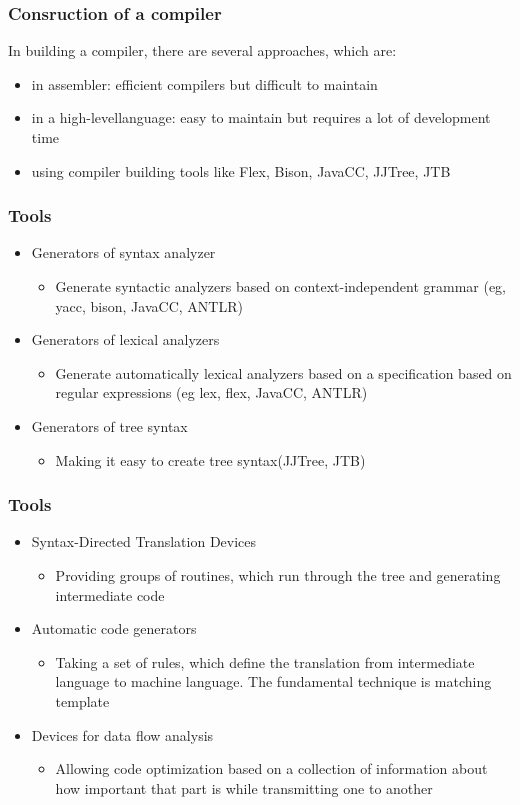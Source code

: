 \documentclass{beamer}
\begin{document}
\begin{frame}
\frametitle{Consruction of a compiler}
In building a compiler, there are several approaches, which are:
\begin{itemize}
\item in assembler: efficient compilers but difficult to maintain
\item in a high-levellanguage: easy to maintain but requires a lot of development time
\item using compiler building tools like Flex, Bison, JavaCC, JJTree, JTB
\end{itemize}
\end{frame}
\begin{frame}
\frametitle{Tools}
\begin{itemize}
\item Generators of syntax analyzer
\begin{itemize}
\item Generate syntactic analyzers based on context-independent grammar (eg, yacc, bison, JavaCC, ANTLR)
\end{itemize}
\item Generators of lexical analyzers
\begin{itemize}
\item Generate automatically lexical analyzers based on a specification based on regular expressions (eg lex, flex, JavaCC, ANTLR)
\end{itemize}
\item Generators of tree syntax
\begin{itemize}
\item Making it easy to create tree syntax(JJTree, JTB)
\end{itemize}
\end{itemize}
\end{frame}
\begin{frame}
\frametitle{Tools}
\begin{itemize}
\item Syntax-Directed Translation Devices
\begin{itemize}
\item Providing groups of routines, which run through the tree and generating intermediate code
\end{itemize}
\item Automatic code generators
\begin{itemize}
\item Taking a set of rules, which define the translation from intermediate language to machine language. The fundamental technique is matching template
\end{itemize}
\item Devices for data flow analysis
\begin{itemize}
\item Allowing code optimization based on a collection of information about how important that part is while transmitting one to another
\end{itemize}
\end{itemize}
\end{frame}
\end{document}
